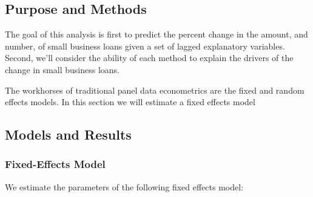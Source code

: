 \documentclass[]{article}
\newenvironment{Shaded}{\begin{snugshade}}{\end{snugshade}}
\newcommand{\CommentTok}[1]{\textcolor[rgb]{0.56,0.35,0.01}{\textit{#1}}}
\newcommand{\DecValTok}[1]{\textcolor[rgb]{0.00,0.00,0.81}{#1}}
\newcommand{\KeywordTok}[1]{\textcolor[rgb]{0.13,0.29,0.53}{\textbf{#1}}}
\newcommand{\NormalTok}[1]{#1}
\newcommand{\OperatorTok}[1]{\textcolor[rgb]{0.81,0.36,0.00}{\textbf{#1}}}
\newcommand{\StringTok}[1]{\textcolor[rgb]{0.31,0.60,0.02}{#1}}
\begin{document}
\begin{Shaded}
\end{Shaded}

\hypertarget{purpose-and-methods}{%
\subsection{Purpose and Methods}\label{purpose-and-methods}}

The goal of this analysis is first to predict the percent change in the
amount, and number, of small business loans given a set of lagged
explanatory variables. Second, we'll consider the ability of each method
to explain the drivers of the change in small business loans.

The workhorses of traditional panel data econometrics are the fixed and
random effects models. In this section we will estimate a fixed effects
model

\hypertarget{models-and-results}{%
\subsection{Models and Results}\label{models-and-results}}

\hypertarget{fixed-effects-model}{%
\subsubsection{Fixed-Effects Model}\label{fixed-effects-model}}

We estimate the parameters of the following fixed effects model:
\end{document}
